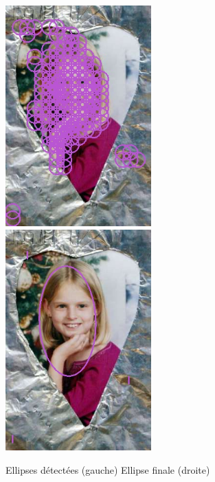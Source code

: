 \documentclass[a4paper,12pt, openany]{book}
\theoremstyle{break}
\begin{document}
 \begin{figure}[H]
   \includegraphics[width=0.5\textwidth]{images/raw_face_img_971}\hfill
   \includegraphics[width=0.5\textwidth]{images/face_img_971}\hfill
   \caption{Ellipses détectées (gauche) Ellipse finale (droite)}
   \label{fig:faces}
 \end{figure}






%
%
% 
% 


%
\end{document}
